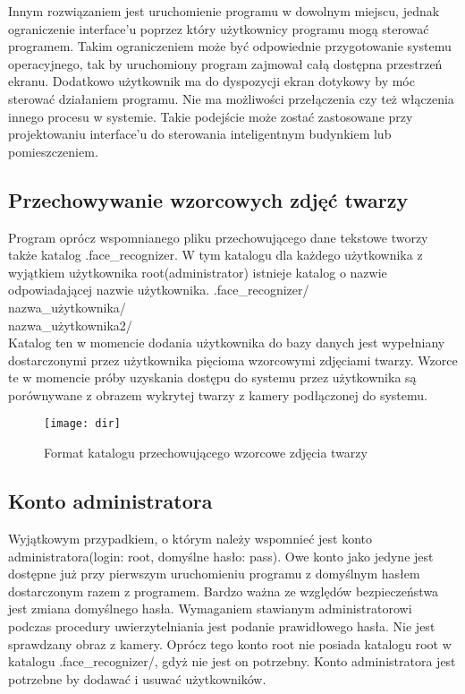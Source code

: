 \documentclass[eng,printmode]{mgr}
\begin{document}
Innym rozwiązaniem jest uruchomienie programu w dowolnym miejscu, jednak ograniczenie interface'u poprzez który użytkownicy programu mogą sterować programem. Takim ograniczeniem może być odpowiednie przygotowanie systemu operacyjnego, tak by uruchomiony program zajmował całą dostępna przestrzeń ekranu. Dodatkowo użytkownik ma do dyspozycji ekran dotykowy by móc sterować działaniem programu. Nie ma możliwości przełączenia czy też włączenia innego procesu w systemie. Takie podejście może zostać zastosowane przy projektowaniu interface'u do sterowania inteligentnym budynkiem lub pomieszczeniem.
\subsection{Przechowywanie wzorcowych zdjęć twarzy}

Program oprócz wspomnianego pliku przechowującego dane tekstowe tworzy także katalog .face\_recognizer. W tym katalogu dla każdego użytkownika z wyjątkiem użytkownika root(administrator) istnieje katalog o nazwie odpowiadającej nazwie użytkownika.
.face\_recognizer/\\
\textbullet nazwa\_użytkownika/\\
\textbullet nazwa\_użytkownika2/\\
Katalog ten w momencie dodania użytkownika do bazy danych jest wypełniany dostarczonymi przez użytkownika  pięcioma wzorcowymi zdjęciami twarzy. Wzorce te w momencie próby uzyskania dostępu do systemu przez użytkownika są porównywane z obrazem wykrytej twarzy z kamery podłączonej do systemu.\\
\begin{figure}[placement h]
\texttt{[image: dir]}
\caption{Format katalogu przechowującego wzorcowe zdjęcia twarzy }
\end{figure}
\subsection{Konto administratora}

Wyjątkowym przypadkiem, o którym należy wspomnieć jest konto administratora(login: root, domyślne hasło: pass). Owe konto jako jedyne jest dostępne już przy pierwszym uruchomieniu programu z domyślnym hasłem dostarczonym razem z programem. Bardzo ważna ze względów bezpieczeństwa jest zmiana domyślnego hasła. Wymaganiem stawianym administratorowi podczas procedury uwierzytelniania jest podanie prawidłowego hasła. Nie jest sprawdzany obraz z kamery. Oprócz tego konto root nie posiada katalogu root w katalogu .face\_recognizer/, gdyż nie jest on potrzebny. Konto administratora jest potrzebne by dodawać i usuwać użytkowników.
\end{document}
